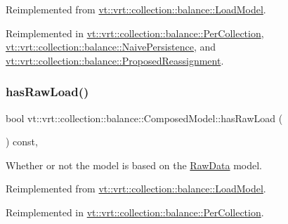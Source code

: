 Reimplemented from \hyperlink{structvt_1_1vrt_1_1collection_1_1balance_1_1_load_model_a27d01248fe1e6cb621bfb04261b5662f}{vt\+::vrt\+::collection\+::balance\+::\+Load\+Model}.



Reimplemented in \hyperlink{structvt_1_1vrt_1_1collection_1_1balance_1_1_per_collection_ac58fae4d9e5480c1fc1844448f54b85a}{vt\+::vrt\+::collection\+::balance\+::\+Per\+Collection}, \hyperlink{structvt_1_1vrt_1_1collection_1_1balance_1_1_naive_persistence_afc45f29c482db810cbdcc73cfca96352}{vt\+::vrt\+::collection\+::balance\+::\+Naive\+Persistence}, and \hyperlink{structvt_1_1vrt_1_1collection_1_1balance_1_1_proposed_reassignment_a30fea286c8e72b3b4533c5b384179ce4}{vt\+::vrt\+::collection\+::balance\+::\+Proposed\+Reassignment}.

\mbox{\label{classvt_1_1vrt_1_1collection_1_1balance_1_1_composed_model_ad6e2a1c572a80e35acad0fcf1a0e8071}} 
\subsubsection{\texorpdfstring{has\+Raw\+Load()}{hasRawLoad()}}
{\footnotesize\ttfamily bool vt\+::vrt\+::collection\+::balance\+::\+Composed\+Model\+::has\+Raw\+Load (\begin{DoxyParamCaption}{ }\end{DoxyParamCaption}) const\hspace{0.3cm}{\ttfamily [override]}, {\ttfamily [virtual]}}



Whether or not the model is based on the \hyperlink{structvt_1_1vrt_1_1collection_1_1balance_1_1_raw_data}{Raw\+Data} model. 



Reimplemented from \hyperlink{structvt_1_1vrt_1_1collection_1_1balance_1_1_load_model_a626f65c651ea15f4a40b9f058778c620}{vt\+::vrt\+::collection\+::balance\+::\+Load\+Model}.



Reimplemented in \hyperlink{structvt_1_1vrt_1_1collection_1_1balance_1_1_per_collection_a82a94bbf8764a3c6bd346e4a686e1efb}{vt\+::vrt\+::collection\+::balance\+::\+Per\+Collection}.


